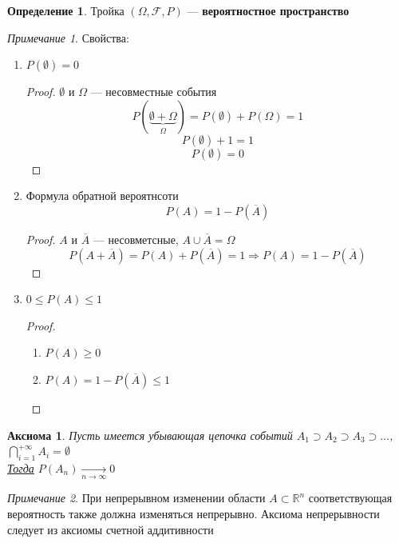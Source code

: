 \documentclass[english]{article}
\newcommand{\R}{\mathbb{R}}
\theoremstyle{plain}
\newtheorem{axiom}{Аксиома}
\theoremstyle{remark}
\newtheorem*{remark}{Примечание}
\theoremstyle{definition}
\newtheorem*{definition}{Определение}
\begin{document}
\begin{definition}
Тройка \((\Omega, \mathcal{F}, P)\) --- \textbf{вероятностное пространство}
\end{definition}
\begin{remark}
Свойства:
\begin{enumerate}
\item \(P(\emptyset) = 0\)
\begin{proof}
\(\emptyset\) и \(\Omega\) --- несовместные события
\[ P(\underbrace{\emptyset + \Omega}_\Omega) = P(\emptyset) + P(\Omega) = 1 \]
\[ P(\emptyset) + 1 = 1 \]
\[ P(\emptyset) = 0 \]
\end{proof}
\item Формула обратной вероятнсоти \[ P(A) = 1 - P(\overline{A}) \]
\begin{proof}
\(A\) и \(\overline{A}\) --- несовметсные, \(A \cup \overline{A} = \Omega\)
\[ P(A + \overline{A}) = P(A) + P(\overline{A}) = 1 \Rightarrow P(A) = 1 - P(\overline{A}) \]
\end{proof}
\item \(0 \le P(A) \le 1\)
\begin{proof}
\-
\begin{enumerate}
\item \(P(A) \ge 0\)
\item \(P(A) = 1 - P(\overline{A}) \le 1\)
\end{enumerate}
\end{proof}
\end{enumerate}
\end{remark}
\begin{axiom}
Пусть имеется убывающая цепочка событий \(A_1 \supset A_2 \supset A_3 \supset \dots\), \(\bigcap_{i = 1}^{+ \infty} A_i = \emptyset\) \\
\uline{Тогда} \(P(A_n) \xrightarrow[n \to \infty]{} 0\)
\end{axiom}
\begin{remark}
При непрерывном изменении области \(A\subset \R^n\) соответствующая вероятность также должна изменяться непрерывно.
Аксиома непрерывности следует из аксиомы счетной аддитивности
\end{remark}
\end{document}
